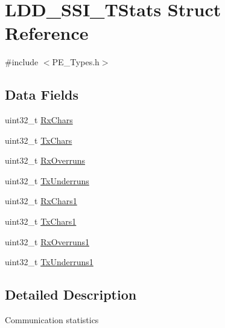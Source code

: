 \hypertarget{struct_l_d_d___s_s_i___t_stats}{\section{L\-D\-D\-\_\-\-S\-S\-I\-\_\-\-T\-Stats Struct Reference}
\label{struct_l_d_d___s_s_i___t_stats}
}


{\ttfamily \#include $<$P\-E\-\_\-\-Types.\-h$>$}

\subsection*{Data Fields}
\begin{DoxyCompactItemize}
\item 
uint32\-\_\-t \hyperlink{struct_l_d_d___s_s_i___t_stats_ac77cdfd687b197b589fbcd43856aeb98}{Rx\-Chars}
\item 
uint32\-\_\-t \hyperlink{struct_l_d_d___s_s_i___t_stats_abaff1182d41c2c211ce8da947df77bbd}{Tx\-Chars}
\item 
uint32\-\_\-t \hyperlink{struct_l_d_d___s_s_i___t_stats_aa2125ae18425d2e4bd193b1ee434c8d9}{Rx\-Overruns}
\item 
uint32\-\_\-t \hyperlink{struct_l_d_d___s_s_i___t_stats_a5ac8911e76989013a9a4757a90aa5660}{Tx\-Underruns}
\item 
uint32\-\_\-t \hyperlink{struct_l_d_d___s_s_i___t_stats_ae5221a07e2a6ad3907c34007693dbc55}{Rx\-Chars1}
\item 
uint32\-\_\-t \hyperlink{struct_l_d_d___s_s_i___t_stats_a0721d681a52cc566e4c89de10e962923}{Tx\-Chars1}
\item 
uint32\-\_\-t \hyperlink{struct_l_d_d___s_s_i___t_stats_af0efb66c36bfe377efb18e6ab2fe4559}{Rx\-Overruns1}
\item 
uint32\-\_\-t \hyperlink{struct_l_d_d___s_s_i___t_stats_a14fb329147ead1d214cd25ffd3b39f6d}{Tx\-Underruns1}
\end{DoxyCompactItemize}


\subsection{Detailed Description}
Communication statistics 

